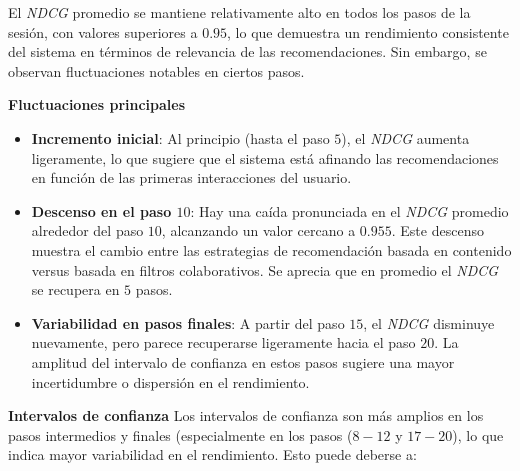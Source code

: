 \documentclass[11pt,a4paper,twoside]{thesis}
\begin{document}
El \textit{NDCG} promedio se mantiene relativamente alto en todos los pasos de la sesión, con valores superiores a $0.95$, lo que demuestra un rendimiento consistente del sistema en términos de relevancia de las recomendaciones. Sin embargo, se observan fluctuaciones notables en ciertos pasos.
\newline
\newline
\newline

\textbf{Fluctuaciones principales}

\begin{itemize}
	\item \textbf{Incremento inicial}: Al principio (hasta el paso $5$), el \textit{NDCG} aumenta ligeramente, lo que sugiere que el sistema está afinando las recomendaciones en función de las primeras interacciones del usuario.
	\item \textbf{Descenso en el paso $10$}: Hay una caída pronunciada en el \textit{NDCG} promedio alrededor del paso $10$, alcanzando un valor cercano a $0.955$. Este descenso muestra el cambio entre las estrategias de recomendación basada en contenido versus basada en filtros colaborativos. Se aprecia que en promedio el \textit{NDCG} se recupera en $5$ pasos.
	\item \textbf{Variabilidad en pasos finales}: A partir del paso $15$, el \textit{NDCG} disminuye nuevamente, pero parece recuperarse ligeramente hacia el paso $20$. La amplitud del intervalo de confianza en estos pasos sugiere una mayor incertidumbre o dispersión en el rendimiento.

\end{itemize}

\textbf{Intervalos de confianza}
Los intervalos de confianza son más amplios en los pasos intermedios y finales (especialmente en los pasos ($8-12$ y $17-20$), lo que indica mayor variabilidad en el rendimiento. Esto puede deberse a:
\end{document}
